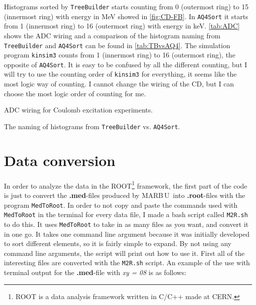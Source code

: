\documentclass[twoside,english]{uiofysmaster/uiofysmaster}
\newcommand{\MBOU}{MAR\belowbaseline[-2pt]{a}B\stackinset{l}{3pt}{b}{-3pt}{O}{O}\,U}
\begin{document}
Histograms sorted by \texttt{TreeBuilder} starts counting from 0 (outermost ring) to 15 (innermost ring) with energy in MeV showed in \autoref{fig:CD-FB}. 
In \texttt{AQ4Sort} it starts from 1 (innermost ring) to 16 (outermost ring) with energy in keV. 
\autoref{tab:ADC} shows the ADC wiring and a comparison of the histogram naming from \texttt{TreeBuilder} and \texttt{AQ4Sort} can be found in \autoref{tab:TBvsAQ4}.
The simulation program \texttt{kinsim3} counts from 1 (innermost ring) to 16 (outermost ring), the opposite of \texttt{AQ4Sort}. 
It is easy to be confused by all the different counting, but I will try to use the counting order of \texttt{kinsim3} for everything, it seems like the most logic way of counting. 
I cannot change the wiring of the CD, but I can choose the most logic order of counting for me.


\begin{table}[ht] 
	\centering 
	\caption{ADC wiring for Coulomb excitation experiments.}
	
	\label{tab:ADC}
\end{table}


\begin{table}[ht] 
	\centering 
	\caption{The naming of histograms from \texttt{TreeBuilder} vs. \texttt{AQ4Sort}.}
	
	\label{tab:TBvsAQ4}
\end{table}


\section{Data conversion}
In order to analyze the data in the ROOT\footnote{ROOT is a data analysis framework written in C/C++ made at CERN.} framework, the first part of the code is just to convert the \textbf{.med}-files produced by \MBOU\ into \textbf{.root}-files with the program \texttt{MedToRoot}. In order to not copy and paste the commands used with \texttt{MedToRoot} in the terminal for every data file, I made a bash script called \texttt{M2R.sh} to do this. It uses \texttt{MedToRoot} to take in as many files as you want, and convert it in one go. It takes one command line argument because it was initially developed to sort different elements, so it is fairly simple to expand. By not using any command line arguments, the script will print out how to use it. First all of the interesting files are converted with the \texttt{M2R.sh} script. An example of the use with terminal output for the \textbf{.med}-file with \textit{xy = 08} is as follows:
\end{document}
